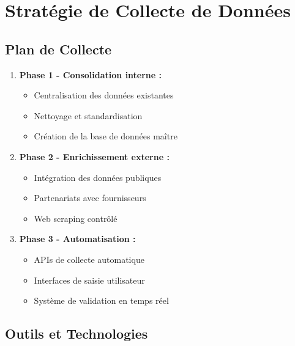 \documentclass[12pt, a4paper]{report}
\begin{document}
\section{Stratégie de Collecte de Données}

\subsection{Plan de Collecte}

\begin{enumerate}
    \item \textbf{Phase 1 - Consolidation interne :}
    \begin{itemize}
        \item Centralisation des données existantes
        \item Nettoyage et standardisation
        \item Création de la base de données maître
    \end{itemize}
    
    \item \textbf{Phase 2 - Enrichissement externe :}
    \begin{itemize}
        \item Intégration des données publiques
        \item Partenariats avec fournisseurs
        \item Web scraping contrôlé
    \end{itemize}
    
    \item \textbf{Phase 3 - Automatisation :}
    \begin{itemize}
        \item APIs de collecte automatique
        \item Interfaces de saisie utilisateur
        \item Système de validation en temps réel
    \end{itemize}
\end{enumerate}

\subsection{Outils et Technologies}
\end{document}
